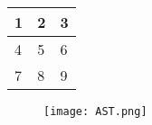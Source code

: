 \documentclass{article}
\begin{document}
\begin{tabular}{| l | l | l | }
\hline
1 & 2 & 3 \\ \hline
4 & 5 & 6 \\ \hline
7 & 8 & 9 \\ \hline
\end{tabular}
\begin{figure}[h]
\texttt{[image: AST.png]}
\end{figure}
\end{document}
